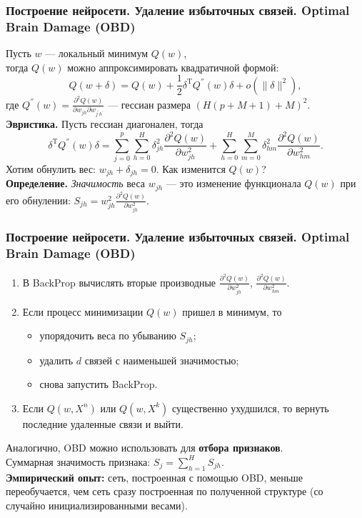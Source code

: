 \documentclass[10pt]{beamer}
\begin{document}
\begin{frame}
\frametitle{Построение нейросети. Удаление избыточных связей. Optimal Brain Damage (OBD)}
Пусть $w$ --- локальный минимум $Q(w)$, \\тогда $Q(w)$ можно аппроксимировать квадратичной формой:
\begin{equation*}
Q(w + \delta) = Q(w) + \frac{1}{2} \delta^{\mathrm{T}} Q^{''}(w) \delta + o(\| \delta\|^2),
\end{equation*}
где $Q^{''}(w) =  \frac{\partial^2 Q(w) }{\partial w_{jh} \partial w_{j^{'}h^{'}}}$ --- гессиан размера $(H(p+M+1) + M)^2$.\\
 \vspace{0.6cm}
 \textbf{Эвристика.} Пусть гессиан диагонален, тогда
 \begin{equation*}
  \delta^{\mathrm{T}} Q^{''}(w) \delta = \sum_{j=0}^{p}\sum_{h=0}^{H} \delta^2_{jh}   \frac{\partial^2 Q(w) }{\partial w_{jh}^2 }  +  \sum_{h=0}^{H}\sum_{m=0}^{M} \delta^2_{hm}   \frac{\partial^2 Q(w) }{\partial w_{hm}^2 }.
 \end{equation*}
 Хотим обнулить вес: $w_{jh} + \delta_{jh}=0$. Как изменится $Q(w)$?\\
  \vspace{0.6cm}
  \textbf{Определение.} \textit{Значимость} веса $w_{jh}$ --- это изменение функционала $Q(w)$ при его обнулении: $S_{jh} = w^2_{jh}  \frac{\partial^2 Q(w) }{\partial w_{jh}^2 } $.
\end{frame} 

\begin{frame}
\frametitle{Построение нейросети. Удаление избыточных связей. Optimal Brain Damage (OBD)}
\begin{enumerate}
\item В BackProp вычислять вторые производные $\frac{\partial^2 Q(w) }{\partial w_{jh}^2 } $,  $\frac{\partial^2 Q(w) }{\partial w_{hm}^2 } $.
\item Если процесс минимизации $Q(w)$ пришел в минимум, то
\begin{itemize}
\item упорядочить веса по убыванию $S_{jh}$;
\item удалить $d$ связей с наименьшей значимостью;
\item снова запустить BackProp.
\end{itemize}
\item Если $Q(w, X^n)$ или $Q(w, X^k)$ существенно ухудшился, то вернуть последние удаленные связи и выйти.
\end{enumerate}
  \vspace{0.5cm}
Аналогично, OBD можно использовать для \textbf{отбора признаков}.\\
Суммарная значимость признака: $S_j = \sum_{h=1}^{H} S_{jh}$.\\
 \vspace{0.5cm}
 \textbf{Эмпирический опыт:} сеть, построенная с помощью OBD, меньше переобучается, чем сеть сразу построенная по полученной структуре (со случайно инициализированными весами).
\end{frame} 
   
\end{document}
